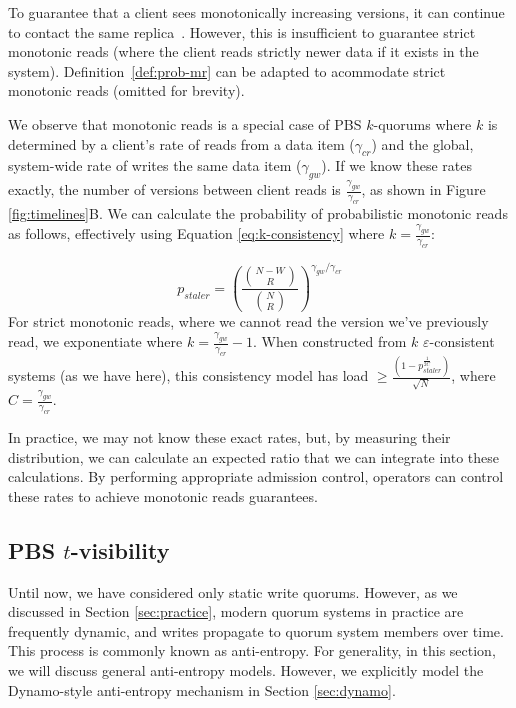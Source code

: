 \documentclass{vldb}
\begin{document}
To guarantee that a client sees monotonically increasing versions, it
can continue to contact the same replica~\cite{vogels-defs}.  However,
this is insufficient to guarantee strict monotonic reads (where the
client reads strictly newer data if it exists in the system).
Definition~\ref{def:prob-mr} can be adapted to acommodate strict
monotonic reads (omitted for brevity).

We observe that monotonic reads is a special case of PBS
$k$-quorums where $k$ is determined by a client's rate of reads from a
data item ($\gamma_{cr}$) and the global, system-wide rate of writes
the same data item ($\gamma_{gw}$).  If we know these rates
exactly, the number of versions between client reads is
$\frac{\gamma_{gw}}{\gamma_{cr}}$, as shown in Figure
\ref{fig:timelines}B.  We can calculate the probability of
probabilistic monotonic reads as follows, effectively using Equation
\ref{eq:k-consistency} where $k=\frac{\gamma_{gw}}{\gamma_{cr}}$:

\begin{equation}
\label{eq:prob-mr}
p_{staler} = \left(\frac{{N-W \choose R}}{{N \choose R}}\right)^{\gamma_{gw}/\gamma_{cr}}
\end{equation}
For strict monotonic reads, where we cannot read the version we've
previously read, we exponentiate where
$k=\frac{\gamma_{gw}}{\gamma_{cr}}-1$.  When constructed from $k$
$\varepsilon$-consistent systems (as we have here), this consistency
model has load $\geq \frac{(1-p_{staler}^{\frac{1}{2C}})}{\sqrt{N}}$,
where $C=\frac{\gamma_{gw}}{\gamma_{cr}}$.

In practice, we may not know these exact rates, but, by measuring
their distribution, we can calculate an expected ratio that we can
integrate into these calculations.  By performing appropriate
admission control, operators can control these rates to achieve
monotonic reads guarantees.

\subsection{PBS $t$-visibility}
\label{sec:tvis}


Until now, we have considered only static write quorums.  However, as
we discussed in Section \ref{sec:practice}, modern quorum systems in
practice are frequently dynamic, and writes propagate to quorum system
members over time.  This process is commonly known as anti-entropy.
For generality, in this section, we will discuss general anti-entropy
models. However, we explicitly model the Dynamo-style anti-entropy
mechanism in Section \ref{sec:dynamo}.
\end{document}
